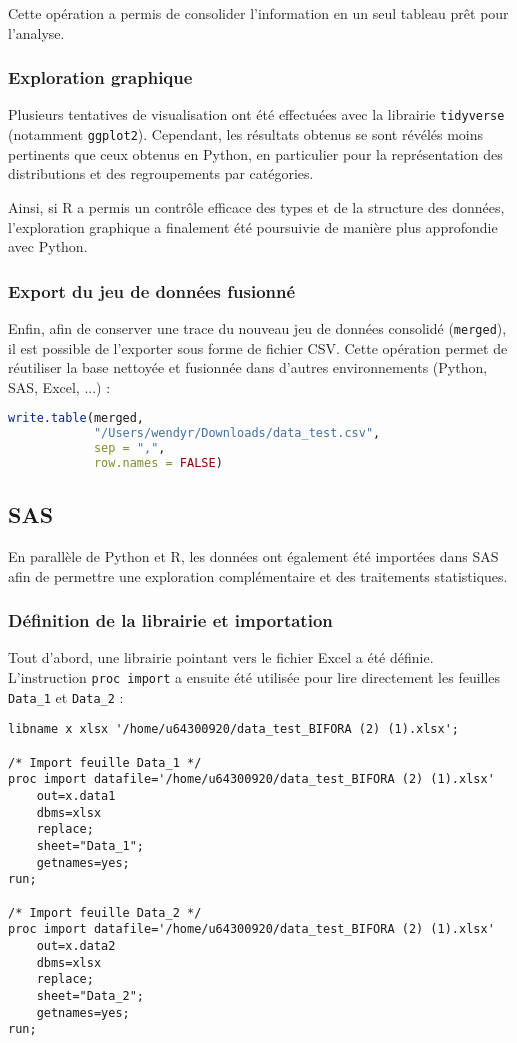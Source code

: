 Cette opération a permis de consolider l'information en un seul tableau prêt pour l'analyse.  

\subsubsection{Exploration graphique}
Plusieurs tentatives de visualisation ont été effectuées avec la librairie \texttt{tidyverse} (notamment \texttt{ggplot2}).  
Cependant, les résultats obtenus se sont révélés moins pertinents que ceux obtenus en Python, en particulier pour la représentation des distributions et des regroupements par catégories.  

Ainsi, si R a permis un contrôle efficace des types et de la structure des données, l'exploration graphique a finalement été poursuivie de manière plus approfondie avec Python.
\subsubsection{Export du jeu de données fusionné}
Enfin, afin de conserver une trace du nouveau jeu de données consolidé (\texttt{merged}), il est possible de l'exporter sous forme de fichier CSV.  
Cette opération permet de réutiliser la base nettoyée et fusionnée dans d'autres environnements (Python, SAS, Excel, ...) :

\begin{lstlisting}[language=R, caption=Exportation du jeu de données fusionné]
write.table(merged,
            "/Users/wendyr/Downloads/data_test.csv",
            sep = ",",
            row.names = FALSE)
\end{lstlisting}

\subsection{SAS}
En parallèle de Python et R, les données ont également été importées dans SAS afin de permettre une exploration complémentaire et des traitements statistiques. 

\subsubsection{Définition de la librairie et importation}
Tout d'abord, une librairie pointant vers le fichier Excel a été définie. L'instruction \texttt{proc import} a ensuite été utilisée pour lire directement les feuilles \texttt{Data\_1} et \texttt{Data\_2} :

\begin{lstlisting}[caption=Importation des données dans SAS]
libname x xlsx '/home/u64300920/data_test_BIFORA (2) (1).xlsx';

/* Import feuille Data_1 */
proc import datafile='/home/u64300920/data_test_BIFORA (2) (1).xlsx'
    out=x.data1
    dbms=xlsx
    replace;
    sheet="Data_1";
    getnames=yes;
run;

/* Import feuille Data_2 */
proc import datafile='/home/u64300920/data_test_BIFORA (2) (1).xlsx'
    out=x.data2
    dbms=xlsx
    replace;
    sheet="Data_2";
    getnames=yes;
run;
\end{lstlisting}

